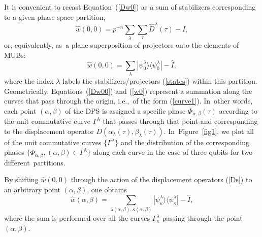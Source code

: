 \documentclass[quantumrep,article,accept,pdftex,moreauthors]{Definitions/mdpi}
\begin{document}
It is convenient to recast Equation~(\ref{Dw0}) as a sum of stabilizers corresponding
to a given phase space partition,
\begin{equation}
  \hat{w}\left(0,0\right)
  = p^{-n} \sum_{\lambda} \sum_{\tau} \hat{D}^{\lambda}(\tau)-\hat{I},
  \label{Dw00}
\end{equation}
or, equivalently, as~a plane superposition of projectors onto the elements of
MUBs:
\begin{equation}
  \hat{w}\left( 0,0\right)
  = \sum_{\lambda} |\psi_{0}^{\lambda}\rangle
  \langle \psi_{0}^{\lambda}| - \hat{I},
  \label{w0}
\end{equation}
where the index $\lambda$ labels the stabilizers/projectors (\ref{states})
within this partition. Geometrically, Equations~(\ref{Dw00}) and (\ref{w0}) represent
a summation along the curves that pass through the origin, i.e.,~of the form
(\ref{curve1}). In~other words, each point $(\alpha,\beta)$ of the DPS is
assigned a specific phase $\Phi_{\alpha, \beta}\left( \tau \right)$ according to
the unit commutative curve $\Gamma^{\lambda}$ that passes through that point and
corresponding to the displacement operator
$D\left(\alpha_{\lambda}(\tau),\beta_{\lambda}(\tau)\right)$.  In~Figure~\ref{fig1}, we plot all of the unit commutative curves
$\{\Gamma^{\lambda}\}$ and the distribution of the corresponding phases
$\{\Phi_{\alpha,\beta},(\alpha,\beta) \in \Gamma^{\lambda}\}$ along each curve
in the case of three qubits for two different~partitions.



By shifting $\hat{w}\left(0,0\right)$ through the action of the displacement
operators (\ref{Ds}) to an arbitrary point $(\alpha,\beta )$, one obtains
\begin{equation}
  \hat{w}(\alpha,\beta)
  = \sum_{\lambda(\alpha,\beta),\kappa(\alpha,\beta)}
  |\psi_{\kappa}^{\lambda}\rangle \langle \psi_{\kappa}^{\lambda}| - \hat{I},
  \label{wab}
\end{equation}
where the sum is performed over all the curves $\Gamma_{\kappa }^{\lambda }$
passing through the point $(\alpha,\beta)$.
\end{document}
